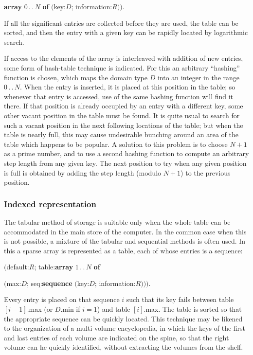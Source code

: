 \tabto*{8em}\textbf{array} $0\,.\,.\,N$ \textbf{of} $($key:$D$; information:$R))$.

\noindent
If all the significant entries are collected before they are used, the table can be sorted, and then the entry with a given key can be rapidly located by logarithmic search.

If access to the elements of the array is interleaved with addition of new entries, some form of hash-table technique is indicated. For this an arbitrary ``hashing'' function is chosen, which maps the domain type $D$ into an integer in the range $0\,.\,.\,N$. When the entry is inserted, it is placed at this position in the table; so whenever that entry is accessed, use of the same hashing function will find it there. If that position is already occupied by an entry with a different key, some other vacant position in the table must be found. It is quite usual to search for such a vacant position in the next following locations of the table; but when the table is nearly full, this may cause undesirable bunching around an area of the table which happens to be popular. A solution to this problem is to choose $N + 1$ as a prime number, and to use a second hashing function to compute an arbitrary step length from any given key. The next position to try when any given position is full is obtained by adding the step length (modulo $N + 1$) to the previous position.

\subsubsection{Indexed representation}

The tabular method of storage is suitable only when the whole table can be
accommodated in the main store of the computer. In the common case
when this is not possible, a mixture of the tabular and sequential methods is
often used. In this a sparse array is represented as a table, each of whose
entries is a sequence:

\quad $($default:$R$; table:\textbf{array} $1\,.\,.\,N$ \textbf{of}

\tabto*{10em}$($max:$D$; seq:\textbf{sequence} $($key:$D$; information:$R)))$.

\noindent
Every entry is placed on that sequence $i$ such that its key fails between table $[i - 1]$.max (or $D$.min if $i = 1$) and table $[i]$.max. The table is sorted so that the appropriate sequence can be quickly located. This technique may be likened to the organization of a multi-volume encyclopedia, in which the keys of the first and last entries of each volume are indicated on the spine, so that the right volume can he quickly identified, without extracting the volumes from the shelf.

